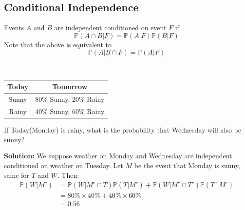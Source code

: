 \newpage
\subsection{Conditional Independence}
\begin{definition}
    Events \(A\) and \(B\) are independent conditioned on event \(F\) if
    \[
        \mathbb{P}(A \cap B \vert F) = \mathbb{P}(A \vert F)\mathbb{P}(B \vert F)
    \]
    Note that the above is equivalent to
    \[
        \mathbb{P}(A \vert B \cap F) = \mathbb{P}(A \vert F)
    \]
\end{definition}

\begin{eg}~ 
    \begin{table}[H]
        \centering
        \begin{tabular}{c|c}
            \toprule
                Today & Tomorrow \\
            \midrule
                Sunny & 80\% Sunny, 20\% Rainy \\
                Rainy & 40\% Sunny, 60\% Rainy  \\
            \bottomrule
        \end{tabular}
    \end{table}
    If Today(Monday) is rainy, what is the probability that Wednesday will also be sunny? 

    \textbf{Solution:}
    We suppose weather on Monday and Wednesday are independent conditioned on weather on Tuesday. Let \(M\) be the event that Monday is sunny, same for \(T\) and \(W\). Then: 
    \[
    \begin{aligned}
        \mathbb{P}(W \vert M^c) &= \mathbb{P}(W \vert M^c \cap T)\mathbb{P}(T \vert M^c) + \mathbb{P}(W \vert M^c \cap T^c)\mathbb{P}(T^c \vert M^c) \\
        &= 80\% \times 40\% + 40\% \times 60\% \\
        &= 0.56
    \end{aligned}
    \]
\end{eg}

